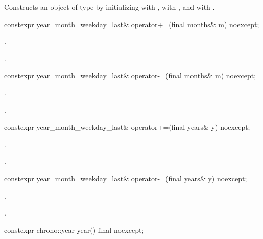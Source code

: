 \begin{itemdescr}
\pnum
\effects
Constructs an object of type  by
initializing  with ,  with , and  with .
\end{itemdescr}

%
\begin{itemdecl}
constexpr year_month_weekday_last& operator+=(final months& m) noexcept;
\end{itemdecl}

\begin{itemdescr}
\pnum
\effects {}.

\pnum
\returns {}.
\end{itemdescr}

%
\begin{itemdecl}
constexpr year_month_weekday_last& operator-=(final months& m) noexcept;
\end{itemdecl}

\begin{itemdescr}
\pnum
\effects {}.

\pnum
\returns {}.
\end{itemdescr}

%
\begin{itemdecl}
constexpr year_month_weekday_last& operator+=(final years& y) noexcept;
\end{itemdecl}

\begin{itemdescr}
\pnum
\effects {}.

\pnum
\returns {}.
\end{itemdescr}

%
\begin{itemdecl}
constexpr year_month_weekday_last& operator-=(final years& y) noexcept;
\end{itemdecl}

\begin{itemdescr}
\pnum
\effects {}.

\pnum
\returns {}.
\end{itemdescr}

%
\begin{itemdecl}
constexpr chrono::year year() final noexcept;
\end{itemdecl}

